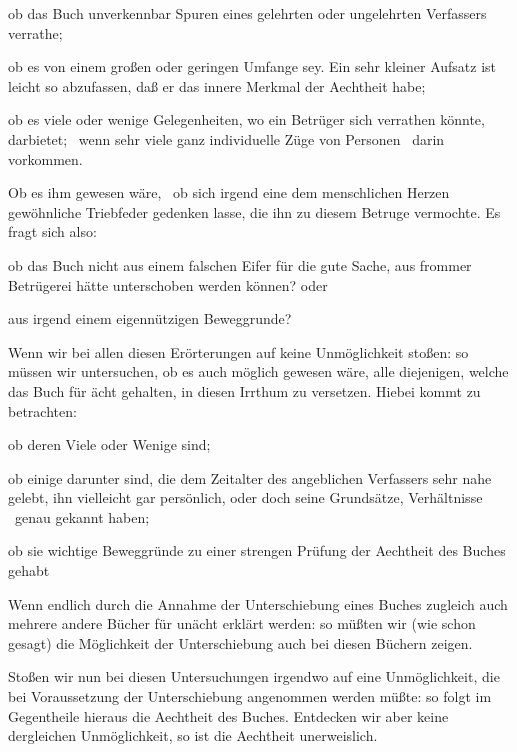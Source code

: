 \begin{aufza}
\begin{aufzb}
\begin{aufzc}
\item ob das Buch unverkennbar Spuren eines gelehrten oder ungelehrten Verfassers verrathe;
\item ob es von einem großen oder geringen Umfange sey. Ein sehr kleiner Aufsatz ist leicht so abzufassen, daß er das innere Merkmal der Aechtheit habe;
\item ob es viele oder wenige Gelegenheiten, wo ein Betrüger sich verrathen könnte, darbietet; \zB\ wenn sehr viele ganz individuelle Züge von Personen \udgl\  darin vorkommen.
\end{aufzc}
\item  Ob es ihm  gewesen wäre, \dh\ ob sich irgend eine dem menschlichen Herzen gewöhnliche Triebfeder gedenken lasse, die ihn zu diesem Betruge vermochte. Es fragt sich also:
\begin{aufzc}
\item ob das Buch nicht aus einem falschen Eifer für die gute Sache, aus frommer Betrügerei hätte unterschoben werden können? oder
\item aus irgend einem eigennützigen Beweggrunde? \usw
\end{aufzc}
\end{aufzb}
\item  Wenn wir bei allen diesen Erörterungen auf keine Unmöglichkeit stoßen: so müssen wir  untersuchen, ob es auch möglich gewesen wäre, alle diejenigen, welche das Buch für ächt gehalten, in diesen Irrthum zu versetzen. Hiebei kommt zu betrachten:
\begin{aufzb}
\item  ob deren Viele oder Wenige sind;
\item  ob einige darunter sind, die dem Zeitalter des angeblichen Verfassers sehr nahe gelebt, ihn vielleicht gar persönlich, oder doch seine Grundsätze, Verhältnisse \usw\ genau gekannt haben;
\item  ob sie wichtige Beweggründe zu einer strengen Prüfung der Aechtheit des Buches gehabt \usw
\end{aufzb}
\item  Wenn endlich durch die Annahme der Unterschiebung eines Buches zugleich auch mehrere andere Bücher für unächt erklärt werden: so müßten wir (wie schon gesagt) die Möglichkeit der Unterschiebung auch bei diesen Büchern zeigen.
\item  Stoßen wir nun bei diesen Untersuchungen irgendwo auf eine Unmöglichkeit, die bei Voraussetzung der Unterschiebung angenommen werden müßte: so folgt im Gegentheile hieraus die Aechtheit des Buches. Entdecken wir aber keine dergleichen Unmöglichkeit, so ist die Aechtheit unerweislich.

\end{aufza}

